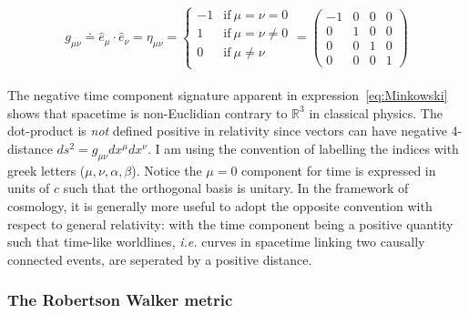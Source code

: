 \begin{equation}
\label{eq:Minkowski}
g_{\mu \nu} \doteq \hat{e}_{\mu} \cdot \hat{e}_{\nu} = \eta_{\mu \nu} = \left\{ 
\begin{array}{rl}
-1 & \text{if}~\mu = \nu = 0\\
1 & \text{if}~\mu = \nu \neq 0\\
0 & \text{if}~\mu \neq \nu\\
\end{array}
\right. = \left(
\begin{array}{rccc}
-1 & 0 & 0 & 0\\
0 & 1 & 0 & 0\\
0 & 0 & 1 & 0\\
0 & 0 & 0 & 1
\end{array}
\right)
\end{equation} \\ The negative time component signature apparent in expression~\ref{eq:Minkowski} shows that spacetime is non-Euclidian contrary to $\mathbb{R}^3$ in classical physics. The dot-product is \emph{not} defined positive in relativity since vectors can have negative 4-distance $ds^2 = g_{\mu \nu}dx^\mu dx^\nu$. I am using the convention of labelling the indices with greek letters ($\mu, \nu, \alpha, \beta$). Notice the $\mu=0$ component for time is expressed in units of $c$ such that the orthogonal basis is unitary. In the framework of cosmology, it is generally more useful to adopt the opposite convention with respect to general relativity: with the time component being a positive quantity such that time-like worldlines, \textit{i.e.} curves in spacetime linking two causally connected events, are seperated by a positive distance. \\

\subsubsection{The Robertson Walker metric}

